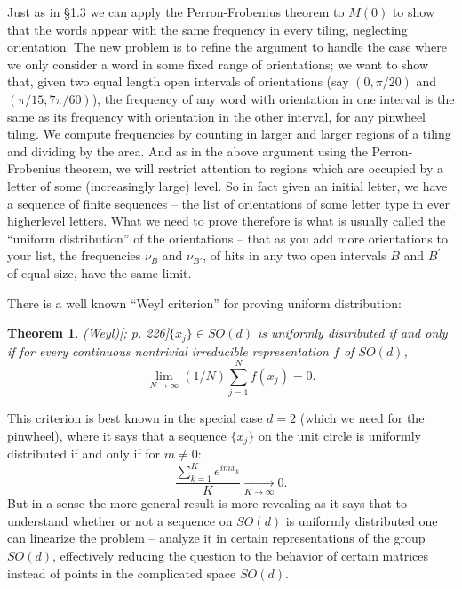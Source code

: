 \documentclass[reqno]{stml-l}
\theoremstyle{plain}
\newtheorem{theorem}{Theorem}[chapter]
\theoremstyle{definition}
\numberwithin{equation}{chapter}
\begin{document}
Just as in \S 1.3 we can apply the Perron-Frobenius theorem to $M(0)$ to show that the words appear with the same frequency in every tiling, neglecting orientation. The new problem is to refine the argument to handle the case where we only consider a word in some fixed range of orientations; we want to show that, given two equal length open intervals of orientations (say $(0, \pi/20)$ and $(\pi/15,7\pi/60)$), the frequency of any word with orientation in one interval is the same as its frequency with orientation in the other interval, for any pinwheel tiling. We compute frequencies by counting in larger and larger regions of a tiling and dividing by the area. And as in the above argument using the Perron-Frobenius theorem, we will restrict attention to regions which are occupied by a letter of some (increasingly large) level. So in fact given an initial letter, we have a sequence of finite sequences
-- the list of orientations of some letter type in ever higherlevel letters. What we need to prove therefore is what is usually called the ``uniform distribution'' of the orientations -- that as you add more orientations to your list, the frequencies $\nu_{B}$ and $\nu_{B{\prime}}$, of hits in any two open intervals $B$ and $B^{\prime}$ of equal size, have the same limit.

There is a well known ``Weyl criterion'' for proving uniform distribution:

\begin{theorem}\emph{(Weyl)[; p. 226]}\label{ch04:thm4.5}
$\{x_{j}\}\in SO(d)$ is uniformly distributed if and only if for every continuous nontrivial irreducible representation $f$ of $SO(d)$,
\begin{equation}\label{ch04:eqn4.11}
\lim_{N\rightarrow\infty}(1/N)\sum\limits_{j=1}^{N}f(x_{j})=0.
\end{equation}
\end{theorem}

This criterion is best known in the special case $d=2$ (which we need for the pinwheel), where it says that a sequence $\{x_{j}\}$ on the unit circle is uniformly distributed if and only if for $m\neq 0$:
\begin{equation}\label{ch04:eqn4.12}
\frac{\sum\nolimits_{k=1}^{K}e^{imx_{k}}}{K}\mathop{\longrightarrow}\limits_{K\rightarrow\infty} 0.
\end{equation}
But in a sense the more general result is more revealing as it says that to understand whether or not a sequence on $SO(d)$ is uniformly distributed one can linearize the problem -- analyze it in certain representations of the group $SO(d)$, effectively reducing the question to the behavior of certain matrices instead of points in the complicated space $SO(d)$.
\end{document}
